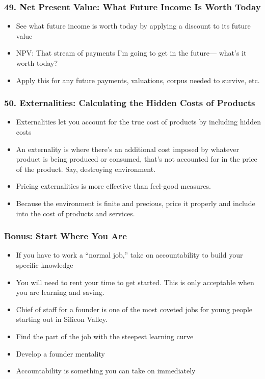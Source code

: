 \begin{frame}[fragile]
\frametitle{49. Net Present Value: What Future Income Is Worth Today}
\begin{itemize}
\item See what future income is worth today by applying a discount to its future value
\item NPV: That stream of payments I’m going to get in the future—
what’s it worth today?
\item Apply this for any future payments, valuations, corpus needed to survive, etc.
\end{itemize}
\end{frame}

\begin{frame}[fragile]
\frametitle{50. Externalities: Calculating the Hidden Costs of Products}
\begin{itemize}
\item Externalities let you account for the true cost of products by including hidden costs
\item  An externality is where there’s an additional cost imposed by whatever product is being produced
or consumed, that’s not accounted for in the price of the product. Say, destroying environment.
\item Pricing externalities is more effective than feel-good measures. 
\item Because the environment is  finite and precious, price it properly and include into the
cost of products and services.
\end{itemize}
\end{frame}


\begin{frame}[fragile]
\frametitle{Bonus: Start Where You Are}
\begin{itemize}
\item If you have to work a “normal job,” take on accountability to build your specific knowledge
\item You will need to rent your time to get started.
This is only acceptable when you are learning and saving.
\item Chief of staff  for a founder is one of the most coveted jobs for young people starting out in Silicon Valley.
\item Find the part of the job with the steepest learning curve
\item Develop a founder mentality
\item Accountability is something you can take on immediately
\end{itemize}
\end{frame}

